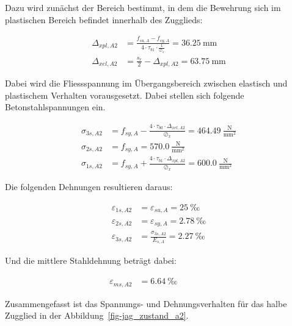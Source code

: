 \documentclass[
  11pt,
  letterpaper,
]{scrreprt}
\begin{document}
Dazu wird zunächst der Bereich bestimmt, in dem die Bewehrung sich im
plastischen Bereich befindet innerhalb des Zugglieds:

\[
\begin{aligned}
\Delta_{x pl , A2}& = \frac{f_{su , A} - f_{sy , A}}{4 \cdot \tau_{b1} \cdot \frac{1}{\oslash_{x}}} = 36.25 \ \mathrm{mm} \\ 
\Delta_{x el , A2}& = \frac{s_{r}}{2} - \Delta_{x pl , A2} = 63.75 \ \mathrm{mm} \end{aligned}
\]

Dabei wird die Fliessspannung im Übergangsbereich zwischen elastisch und
plastischem Verhalten vorausgesetzt. Dabei stellen sich folgende
Betonstahlspannungen ein.

\[
\begin{aligned}
\sigma_{3 s , A2}& = f_{sy , A} - \frac{4 \cdot \tau_{b0} \cdot \Delta_{x el , A2}}{\oslash_{x}} = 464.49 \ \frac{\mathrm{N}}{\mathrm{mm}^{2}} \\ 
\sigma_{2 s , A2}& = f_{sy , A} = 570.0 \ \frac{\mathrm{N}}{\mathrm{mm}^{2}} \\ 
\sigma_{1 s , A2}& = f_{sy , A} + \frac{4 \cdot \tau_{b1} \cdot \Delta_{x pl , A2}}{\oslash_{x}} = 600.0 \ \frac{\mathrm{N}}{\mathrm{mm}^{2}} \end{aligned}
\]

Die folgenden Dehnungen resultieren daraus:

\[
\begin{aligned}
\varepsilon_{1 s , A2}& = \varepsilon_{su , A} = 25 \ \mathrm{‰} \\ 
\varepsilon_{2 s , A2}& = \varepsilon_{sy , A} = 2.78 \ \mathrm{‰} \\ 
\varepsilon_{3 s , A2}& = \frac{\sigma_{3 s , A2}}{E_{s , A}} = 2.27 \ \mathrm{‰} \end{aligned}
\]

Und die mittlere Stahldehnung beträgt dabei:

\[
\begin{aligned}
\varepsilon_{m s , A2}& = 6.64 \ \mathrm{‰} \quad &  \quad &  
 \end{aligned}
\]

Zusammengefasst ist das Spannungs- und Dehnungsverhalten für das halbe
Zugglied in der Abbildung~\ref{fig-jag_zustand_a2}.
\end{document}
